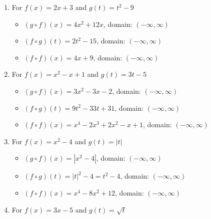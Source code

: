 \begin{enumerate}
\setcounter{enumi}{\value{HW}}

\item For $f(x) = 2x+3$ and $g(t) = t^2-9$

\begin{itemize}

\item  $(g \circ f)(x) = 4x^2+12x$, domain: $(-\infty, \infty)$

\item  $(f \circ g)(t) = 2t^2-15$, domain: $(-\infty, \infty)$

\item  $(f \circ f)(x) = 4x+9$, domain: $(-\infty, \infty)$

\end{itemize}


\item For  $f(x) = x^2 -x+1$ and $g(t) = 3t-5$ 

\begin{itemize}

\item  $(g \circ f)(x) = 3x^2-3x-2$, domain: $(-\infty, \infty)$

\item  $(f \circ g)(t) =9t^2-33t+31$, domain: $(-\infty, \infty)$

\item  $(f \circ f)(x) = x^4-2x^3+2x^2-x+1$, domain: $(-\infty, \infty)$

\end{itemize}

\item For  $f(x) = x^2-4$ and $g(t) = |t|$ 

\begin{itemize}

\item  $(g \circ f)(x) = |x^2-4|$, domain: $(-\infty, \infty)$

\item  $(f \circ g)(t) =|t|^2-4 = t^2-4$, domain: $(-\infty, \infty)$

\item  $(f \circ f)(x) =x^4-8x^2+12$, domain: $(-\infty, \infty)$

\end{itemize}

\item For   $f(x) = 3x-5$ and $g(t) = \sqrt{t}$ 

\begin{itemize}


\end{itemize}
\end{enumerate}
